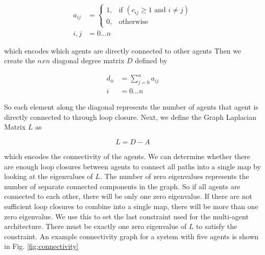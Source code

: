 \documentclass[letterpaper, 10 pt, conference]{ieeeconf}  %
\begin{document}
\begin{align}
  a_{ij} &=
  \begin{cases}
    1, & \text{if } (c_{ij} \geq 1 \text{ and } i \neq j)\\
    0, & \text{otherwise}
  \end{cases}\\
  i,j &=0 ...n \nonumber
\end{align}

which encodes which agents are directly connected to other agents
Then we create the $nxn$ diagonal degree matrix $D$ defined by

\begin{align}
  d_{ii} &= \sum_{j=0}^{n} a_{ij} \\
  i &= 0 ... n \nonumber
\end{align}

So each element along the diagonal represents the number of agents that agent is directly connected to through loop closure. Next, we define the Graph Laplacian Matrix $L$ as

\begin{equation}
  L = D-A
\end{equation}

which encodes the connectivity of the agents. We can determine whether there are enough loop closures between agents to connect all paths into a single map by looking at the eigenvalues of $L$. The number of zero eigenvalues represents the number of separate connected components in the graph. So if all agents are connected to each other, there will be only one zero eigenvalue. If there are not sufficient loop closures to combine into a single map, there will be more than one zero eigenvalue. We use this to set the last constraint used for the multi-agent architecture. There must be exactly one zero eigenvalue of $L$ to satisfy the constraint. An example connectivity graph for a system with five agents is shown in Fig. \ref{fig:connectivity}
\end{document}
